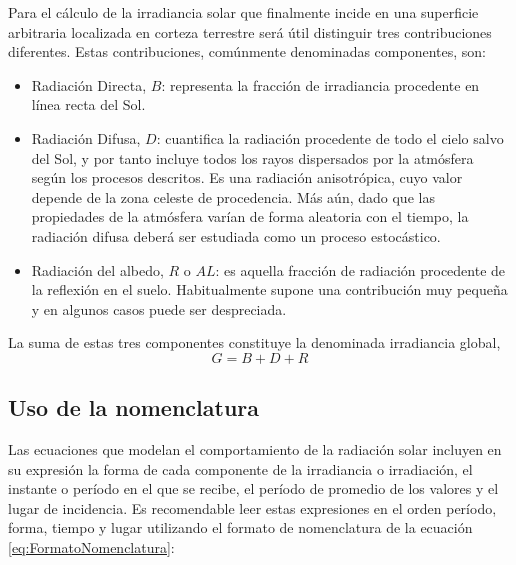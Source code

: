 Para el cálculo de la irradiancia solar que finalmente incide en una
superficie arbitraria localizada en corteza terrestre será útil distinguir
tres contribuciones diferentes. Estas contribuciones, comúnmente denominadas
componentes, son:
\begin{itemize}
\item Radiación Directa, $B$: representa la fracción de irradiancia procedente
en línea recta del Sol.
\item Radiación Difusa, $D$: cuantifica la radiación procedente de todo
el cielo salvo del Sol, y por tanto incluye todos los rayos dispersados
por la atmósfera según los procesos descritos. Es una radiación anisotrópica,
cuyo valor depende de la zona celeste de procedencia. Más aún, dado
que las propiedades de la atmósfera varían de forma aleatoria con
el tiempo, la radiación difusa deberá ser estudiada como un proceso
estocástico.
\item Radiación del albedo, $R$ o $AL$:
es aquella fracción de radiación procedente de la reflexión en el
suelo. Habitualmente supone una contribución muy pequeña y en algunos
casos puede ser despreciada.
\end{itemize}
La suma de estas tres componentes constituye la denominada irradiancia
global, \begin{equation}
G=B+D+R\end{equation}


\subsection{Uso de la nomenclatura}

Las ecuaciones que modelan el comportamiento de la radiación solar
incluyen en su expresión la forma de cada componente de la irradiancia
o irradiación, el instante o período en el que se recibe, el período
de promedio de los valores y el lugar de incidencia. Es recomendable
leer estas expresiones en el orden período, forma, tiempo y lugar
utilizando el formato de nomenclatura de la ecuación \ref{eq:FormatoNomenclatura}:

